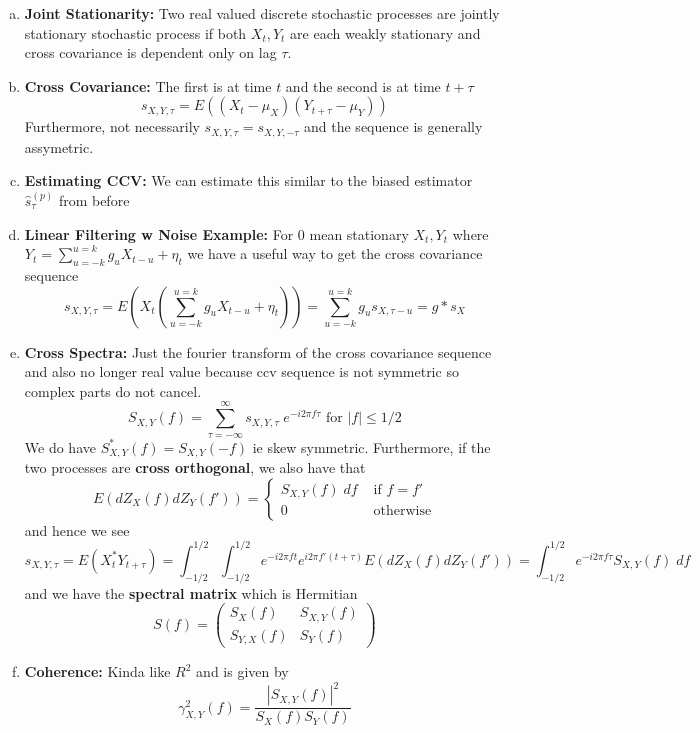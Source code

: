 \documentclass{article}
\begin{document}
\begin{enumerate} [a.]
    \item \textbf{Joint Stationarity:} Two real valued discrete stochastic processes are jointly stationary stochastic process if both \(X_t, Y_t\) are each weakly stationary and cross covariance is dependent only on lag \(\tau\).
    \item \textbf{Cross Covariance:} The first is at time \(t\) and the second is at time \(t + \tau\)
    \[
    s_{X, Y, \tau} = E((X_t-\mu_X)(Y_{t+\tau} - \mu_Y))
    \]
    Furthermore, not necessarily \(s_{X, Y, \tau} = s_{X, Y, -\tau}\) and the sequence is generally assymetric.
    \item \textbf{Estimating CCV:} We can estimate this similar to the biased estimator \(\hat s_\tau^{(p)}\) from before

    \item \textbf{Linear Filtering w Noise Example:} For 0 mean stationary  \(X_t, Y_t\) where \(Y_t = \sum_{u = -k}^{u=k}g_uX_{t-u} + \eta_t\) we have a useful way to get the cross covariance sequence
    \[
    s_{X, Y, \tau} = E\left(X_t\left(\sum_{u = -k}^{u=k}g_uX_{t-u} + \eta_t \right)\right) = \sum_{u = -k}^{u=k}g_u s_{X, \tau-u} = g*s_X
    \]
    \item \textbf{Cross Spectra:} Just the fourier transform of the cross covariance sequence and also no longer real value because ccv sequence is not symmetric so complex parts do not cancel.
    \[
    S_{X, Y}(f) = \sum_{\tau = -\infty}^{\infty} s_{X,Y,\tau} \;e^{-i2\pi f\tau} \text{ for } |f|\leq 1/2
    \]
    We do have \(S_{X, Y}^*(f) = S_{X, Y}(-f)\) ie skew symmetric. Furthermore, if the two processes are \textbf{cross orthogonal}, we also have that 
    \[
    E(dZ_X(f)dZ_Y(f')) = \begin{cases}
        S_{X,Y}(f)\;df & \text{ if }f=f'\\
        0 & \text{ otherwise}
    \end{cases}
    \]
    and hence we see
    \[
    s_{X,Y, \tau} = E(X^*_tY_{t+\tau}) = \int_{-1/2}^{1/2}\int_{-1/2}^{1/2}e^{-i 2 \pi f t}e^{i 2 \pi f' (t + \tau)} E(dZ_X(f)dZ_Y(f')) = \int_{-1/2}^{1/2} e^{-i2\pi f\tau} S_{X,Y}(f)\;df
    \]
    and we have the \textbf{spectral matrix} which is Hermitian
    \[
    S(f) = \begin{pmatrix}
        S_X(f)&S_{X,Y}(f)\\
        S_{Y,X}(f) & S_Y(f)
    \end{pmatrix}
    \]

    \item \textbf{ Coherence:} Kinda like \(R^2\) and is given by
    \[
    \gamma^2_{X,Y}(f) = \frac{|S_{X,Y}(f)|^2}{S_X(f)S_Y(f)}
    \]


\end{enumerate}
\end{document}
